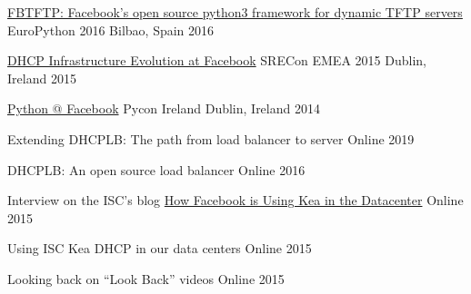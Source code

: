 
\begin{cvhonors}
  \cvhonor
  {\href{https://www.angelofailla.com/public_talks/2016-europython-fbtftp/}{FBTFTP: Facebook's open source python3 framework for dynamic TFTP servers}} %
  {EuroPython 2016}
  {Bilbao, Spain} %
  {2016} %

  \cvhonor
  {\href{https://www.angelofailla.com/public_talks/2015-srecon-emea-kea/}{DHCP Infrastructure Evolution at Facebook}}
  {SRECon EMEA 2015}
  {Dublin, Ireland} %
  {2015} %

  \cvhonor
  {\href{https://www.angelofailla.com/public_talks/2014-pyconireland-python@fb/}{Python @ Facebook}}
  {Pycon Ireland}
  {Dublin, Ireland} %
  {2014} %

\end{cvhonors}


\begin{cvhonors}
  \cvhonor
  {Extending DHCPLB: The path from load balancer to server}
  {} %
  {Online} %
  {2019} %

  \cvhonor
  {DHCPLB: An open source load balancer}
  {} %
  {Online} %
  {2016} %

  \cvhonor
  {Interview on the ISC's blog}
  {\href{https://www.isc.org/blogs/how-facebook-is-using-kea-in-the-datacenter/}{How Facebook is Using Kea in the Datacenter}}
  {Online} %
  {2015} %

  \cvhonor
  {Using ISC Kea DHCP in our data centers }
  {} %
  {Online} %
  {2015} %

  \cvhonor
  {Looking back on “Look Back” videos}
  {}
  {Online} %
  {2015} %

\end{cvhonors}